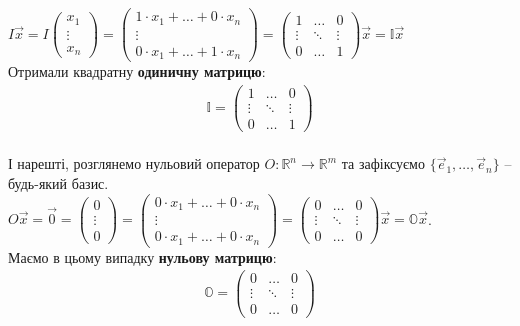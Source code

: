 \documentclass[a4paper, 10pt]{article}
\theoremstyle{theoremdd}
\begin{document}
	$I \vec{x} = I \begin{pmatrix}
	x_1 \\ \vdots \\ x_n
	\end{pmatrix} = \begin{pmatrix}
	1 \cdot x_1 + \dots + 0 \cdot x_n \\ \vdots \\ 0 \cdot x_1 + \dots + 1 \cdot x_n
	\end{pmatrix} = \begin{pmatrix}
	1 & \dots & 0 \\
	\vdots & \ddots & \vdots \\
	0 & \dots & 1
	\end{pmatrix} \vec{x} = \mathbb{I} \vec{x}$
	\\
	Отримали квадратну \textbf{одиничну матрицю}:
	\begin{align*}
	\mathbb{I} = \begin{pmatrix}
	1 & \dots & 0 \\
	\vdots & \ddots & \vdots \\
	0 & \dots & 1
	\end{pmatrix}
	\end{align*}
	\bigskip \\
	І нарешті, розглянемо нульовий оператор $O \colon \mathbb{R}^n \to \mathbb{R}^m$ та зафіксуємо $\{\vec{e}_1, \dots, \vec{e}_n\}$ -- будь-який базис.\\
	$O \vec{x} = \vec{0} = \begin{pmatrix}
	0 \\ \vdots \\ 0
	\end{pmatrix} = \begin{pmatrix}
	0 \cdot x_1 + \dots + 0 \cdot x_n \\ \vdots \\ 0 \cdot x_1 + \dots + 0 \cdot x_n 
	\end{pmatrix} = \begin{pmatrix}
	0 & \dots & 0 \\
	\vdots & \ddots & \vdots \\
	0 & \dots & 0
	\end{pmatrix} \vec{x} = \mathbb{O} \vec{x}$.\\
	Маємо в цьому випадку \textbf{нульову матрицю}:
	\begin{align*}
	\mathbb{O} = \begin{pmatrix}
	0 & \dots & 0 \\
	\vdots & \ddots & \vdots \\
	0 & \dots & 0
	\end{pmatrix}
	\end{align*}
\end{document}
